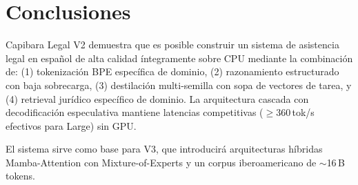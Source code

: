 \documentclass[11pt,a4paper]{article}
\begin{document}
\section{Conclusiones}
\label{sec:conclusion}

Capibara Legal V2 demuestra que es posible construir un sistema de asistencia legal
en español de alta calidad íntegramente sobre CPU mediante la combinación de:
(1) tokenización BPE específica de dominio, (2) razonamiento estructurado con baja
sobrecarga, (3) destilación multi-semilla con sopa de vectores de tarea, y (4) retrieval
jurídico específico de dominio. La arquitectura cascada con decodificación especulativa
mantiene latencias competitivas ($\geq$360\,tok/s efectivos para Large) sin GPU.

El sistema sirve como base para V3, que introducirá arquitecturas híbridas
Mamba-Attention con Mixture-of-Experts y un corpus iberoamericano de $\sim$16\,B
tokens.
\end{document}

